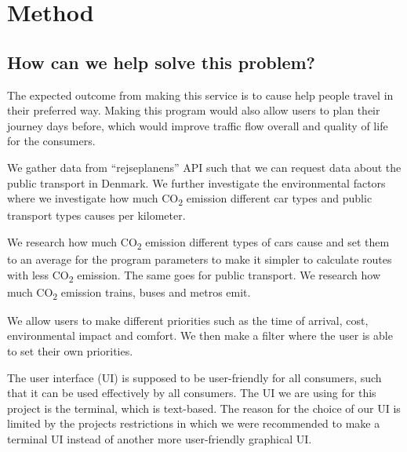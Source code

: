\chapter{Method}\label{ch:method}

\section{How can we help solve this problem?}\label{sec:how-can-we-help-solve-this-problem?}

The expected outcome from making this service is to cause help people travel in their preferred way.
Making this program would also allow users to plan their journey days before, which would improve traffic flow
overall and quality of life for the consumers.

We gather data from ``rejseplanens'' API such that we can request data about the public transport in Denmark.
We further investigate the environmental factors where we investigate how much \unit{CO_{2}} emission
different car types and public transport types causes per kilometer.

We research how much \unit{CO_{2}} emission different types of cars cause and set them to an average for
the program parameters to make it simpler to calculate routes with less \unit{CO_{2}} emission.
The same goes for public transport.
We research how much \unit{CO_{2}} emission trains, buses and metros emit.

We allow users to make different priorities such as the time of arrival, cost, environmental impact and comfort.
We then make a filter where the user is able to set their own priorities.

The user interface (UI) is supposed to be user-friendly for all consumers, such that it can be used effectively by all
consumers.
The UI we are using for this project is the terminal, which is text-based.
The reason for the choice of our UI is limited by the projects restrictions in which we were recommended to make a
terminal UI instead of another more user-friendly graphical UI\@.
